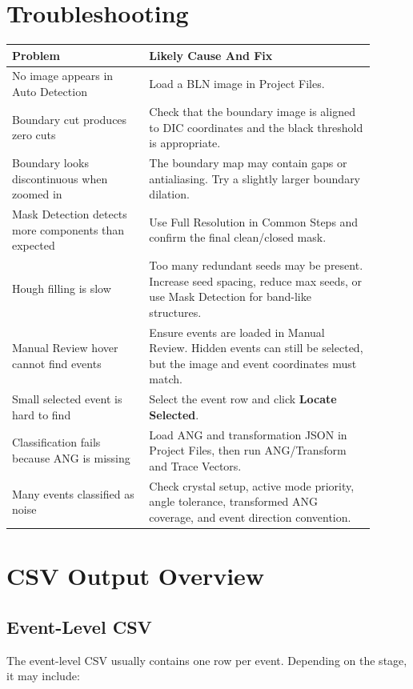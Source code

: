 \documentclass[11pt]{article}
\newcommand{\ui}[1]{\textbf{#1}}
\begin{document}
\section{Troubleshooting}

\begin{longtable}{p{0.34\linewidth}p{0.56\linewidth}}
\toprule
\textbf{Problem} & \textbf{Likely Cause And Fix} \\
\midrule
No image appears in Auto Detection & Load a BLN image in Project Files. \\
Boundary cut produces zero cuts & Check that the boundary image is aligned to DIC coordinates and the black threshold is appropriate. \\
Boundary looks discontinuous when zoomed in & The boundary map may contain gaps or antialiasing. Try a slightly larger boundary dilation. \\
Mask Detection detects more components than expected & Use Full Resolution in Common Steps and confirm the final clean/closed mask. \\
Hough filling is slow & Too many redundant seeds may be present. Increase seed spacing, reduce max seeds, or use Mask Detection for band-like structures. \\
Manual Review hover cannot find events & Ensure events are loaded in Manual Review. Hidden events can still be selected, but the image and event coordinates must match. \\
Small selected event is hard to find & Select the event row and click \ui{Locate Selected}. \\
Classification fails because ANG is missing & Load ANG and transformation JSON in Project Files, then run ANG/Transform and Trace Vectors. \\
Many events classified as noise & Check crystal setup, active mode priority, angle tolerance, transformed ANG coverage, and event direction convention. \\
\bottomrule
\end{longtable}

\section{CSV Output Overview}

\subsection{Event-Level CSV}

The event-level CSV usually contains one row per event. Depending on the stage, it may include:
\end{document}
